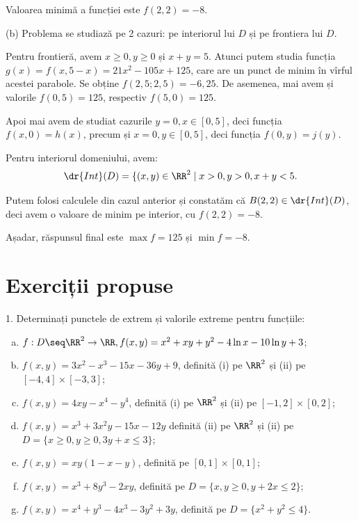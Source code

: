 Valoarea minimă a funcției este $ f(2, 2) = -8 $.

\vspace{1cm}

(b) Problema se studiază pe 2 cazuri: pe interiorul lui $ D $ și pe frontiera lui $ D $.

Pentru frontieră, avem $ x \geq 0, y \geq 0 $ și $ x + y = 5 $. Atunci putem
studia funcția $ g(x) = f(x, 5-x) = 21x^2 - 105x + 125 $, care are un punct
de minim în vîrful acestei parabole. Se obține $ f(2,5; 2,5) = -6,25 $.
De asemenea, mai avem și valorile $ f(0, 5) = 125 $, respectiv $ f(5, 0) = 125 $.

Apoi mai avem de studiat cazurile $ y = 0, x \in [0, 5] $, deci funcția
$ f(x, 0) = h(x) $, precum și $ x = 0, y \in [0, 5] $, deci funcția
$ f(0, y) = j(y) $.

Pentru interiorul domeniului, avem:
\[
  \dr{Int}(D) = \{ (x, y) \in \RR^2 \mid x > 0, y > 0, x + y < 5.
\]

Putem folosi calculele din cazul anterior și constatăm că $ B(2, 2) \in \dr{Int}(D) $,
deci avem o valoare de minim pe interior, cu $ f(2, 2) = -8 $.

Așadar, răspunsul final este $ \max f = 125 $ și $ \min f = -8 $.


\section{Exerciții propuse}

1. Determinați punctele de extrem și valorile extreme pentru funcțiile:
\begin{enumerate}[(a)]
\item $ f : D \seq \RR^2 \to \RR, f(x, y) = x^2 + xy + y^2 - 4 \ln x - 10\ln y + 3 $;
\item $ f(x, y) = 3x^2 - x^3 - 15x - 36y + 9 $, definită (i) pe $ \RR^2 $
  și (ii) pe $ [-4,4] \times [-3, 3] $;
\item $ f(x, y) = 4xy - x^4 - y^4 $, definită (i) pe $ \RR^2 $ și (ii) pe
  $ [-1, 2] \times [0, 2] $;
\item $ f(x, y) = x^3 + 3x^2y - 15x - 12y $ definită (ii) pe $ \RR^2 $ și
  (ii) pe $ D = \{ x \geq 0, y \geq 0, 3y + x \leq 3 \} $;
\item $ f(x, y) = xy(1 - x - y) $, definită pe $ [0, 1] \times [0, 1] $;
\item $ f(x, y) = x^3 + 8y^3 - 2xy $, definită pe $ D = \{ x, y \geq 0, y + 2x \leq 2 \} $;
\item $ f(x, y) = x^4 + y^3 - 4x^3 - 3y^2 + 3y $, definită pe
  $ D = \{ x^2 + y^2 \leq 4 \} $.
\end{enumerate}
 
